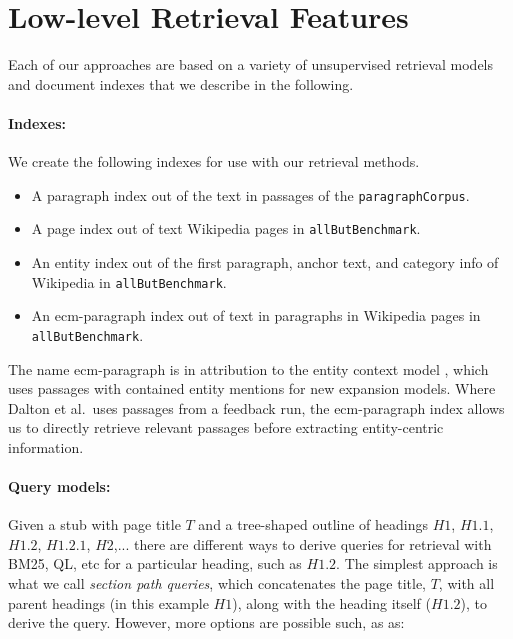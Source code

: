 \documentclass{article}
\begin{document}
\section{Low-level Retrieval Features}

Each of our approaches are based on a variety of unsupervised retrieval models and document indexes that we describe in the following.

\paragraph{Indexes:}

We create the following indexes for use with our retrieval methods. 
\begin{itemize}
    \item A paragraph index out of the text in passages of the \texttt{paragraphCorpus}.
    \item A page index out of text Wikipedia pages in \texttt{allButBenchmark}. 
    \item An entity index out of the first paragraph, anchor text, and category info of Wikipedia in \texttt{allButBenchmark}.
    \item An ecm-paragraph index out of text in paragraphs in Wikipedia pages in \texttt{allButBenchmark}.
\end{itemize}

The name ecm-paragraph is in attribution to the entity context model \cite{dalton2014entity}, which uses passages with contained entity mentions for new expansion models. Where Dalton et al.\ uses passages from a feedback run, the ecm-paragraph index allows us to directly retrieve relevant passages before extracting entity-centric information.

\paragraph{Query models:}
Given a stub with page title $T$ and a tree-shaped outline of headings $H1$, $H1.1$, $H1.2$, $H1.2.1$, $H2$,... there are different ways to derive queries for retrieval with BM25, QL, etc for a particular heading, such as $H1.2$. The simplest approach is what we call \textit{section path queries}, which concatenates the page title, $T$, with all parent headings (in this example $H1$), along with the heading itself ($H1.2$), to derive the query. However, more options are possible such, as as:
\end{document}
